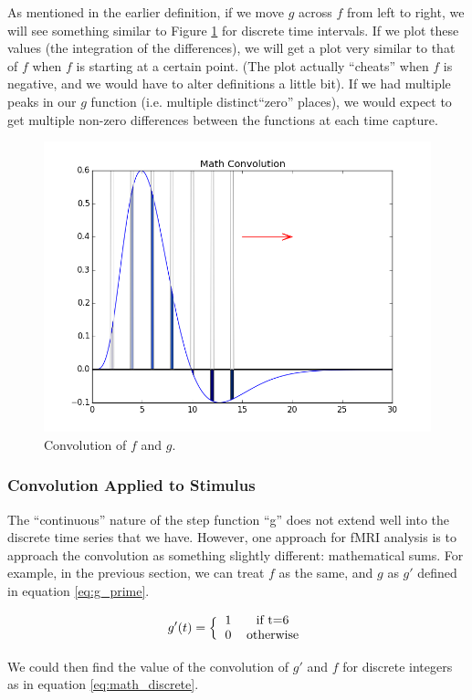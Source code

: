 As mentioned in the earlier definition, if we move $g$ across $f$ from 
left to right, we will see something similar to Figure \ref{fig:math} for 
discrete time intervals. If we plot these values (the integration of the 
differences), we will get a plot very similar to that of $f$ when $f$ is 
starting at a certain point. (The plot actually ``cheats'' when $f$ is 
negative, and we would have to alter definitions a little bit). If we had 
multiple peaks in our $g$ function (i.e. multiple distinct``zero'' places), we 
would expect to get multiple non-zero differences between the functions at 
each time capture. 

\begin{figure}[ht]
	\centering
	\includegraphics[width=.5\linewidth]{../images/math_convolved.png}
	\caption{Convolution of $f$ and $g$.}
	\label{fig:math}
\end{figure}


\subsubsection{Convolution Applied to Stimulus}

The ``continuous'' nature of the step function ``g'' does not extend well into 
the discrete time series that we have. However, one approach for fMRI analysis 
is to approach the convolution as something slightly different: mathematical 
sums. For example, in the previous section, we can treat $f$ as the same, and 
$g$ as $g'$ defined in equation \ref{eq:g_prime}.

\begin{equation}\label{eq:g_prime}
 g'(t)=\Big \{ \begin{tabular}{l c}
 		1  & if t=6\\
 		0  & otherwise \\
 		\end{tabular} \end{equation}

We could then find the value of the convolution of $g'$ and $f$ for discrete 
integers as in equation \ref{eq:math_discrete}.


